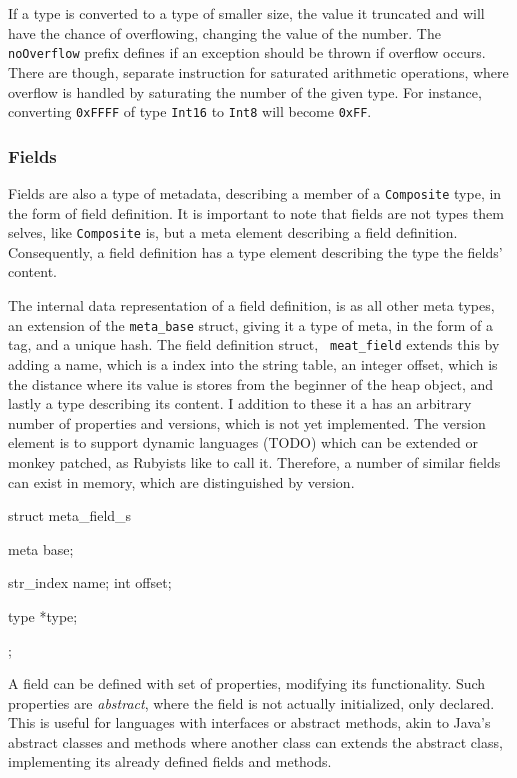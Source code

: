 If a type is converted to a type of smaller size, the value it truncated and
will have the chance of overflowing, changing the value of the number. The {\tt
  noOverflow} prefix defines if an exception should be thrown if overflow
occurs. There are though, separate instruction for saturated arithmetic
operations, where overflow is handled by saturating the number of the given
type. For instance, converting {\tt 0xFFFF} of type {\tt Int16} to {\tt Int8}
will become {\tt 0xFF}.


\subsubsection{Fields}
\label{implementation:meta:fields}

Fields are also a type of metadata, describing a member of a {\tt Composite}
type, in the form of field definition. It is important to note that fields are
not types them selves, like {\tt Composite} is, but a meta element describing a
field definition. Consequently, a field definition has a type element describing
the type the fields' content.

The internal data representation of a field definition, is as all other meta
types, an extension of the {\tt meta\_base} struct, giving it a type of meta, in
the form of a tag, and a unique hash. The field definition struct, {\tt
  meat\_field} extends this by adding a name, which is a index into the string
table, an integer offset, which is the distance where its value is stores from
the beginner of the heap object, and lastly a type describing its content. I
addition to these it a has an arbitrary number of properties and versions, which
is not yet implemented. The version element is to support dynamic languages
(TODO) which can be extended or monkey patched, as Rubyists like to call
it. Therefore, a number of similar fields can exist in memory, which are
distinguished by version. %

\begin{ccode} %
struct meta_field_s {
    meta base;

    str_index name;
    int offset;

    type *type;
};
\end{ccode}

A field can be defined with set of properties, modifying its
functionality. Such properties are {\em abstract}, where the field is not
actually initialized, only declared. This is useful for languages with
interfaces or abstract methods, akin to Java's abstract classes and methods
where another class can extends the abstract class, implementing its already
defined fields and methods.

